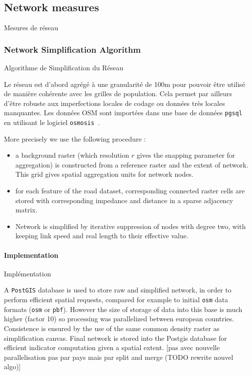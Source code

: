 \subsection{Network measures}{Mesures de réseau}




\subsubsection{Network Simplification Algorithm}{Algorithme de Simplification du Réseau}



Le réseau est d'abord agrégé à une granularité de 100m pour pouvoir être utilisé de manière cohérente avec les grilles de population. Cela permet par ailleurs d'être robuste aux imperfections locales de codage ou données très locales manquantes. Les données OSM sont importées dans une base de données \texttt{pgsql} en utilisant le logiciel \texttt{osmosis}~\cite{osmosis}.

 
 
More precisely we use the following procedure :
\begin{itemize}
\item a background raster (which resolution $r$ gives the snapping parameter for aggregation) is constructed from a reference raster and the extent of network. This grid gives spatial aggregation units for network nodes.
\item for each feature of the road dataset, corresponding connected raster cells are stored with corresponding impedance and distance in a sparse adjacency matrix.
\item Network is simplified by iterative suppression of nodes with degree two, with keeping link speed and real length to their effective value.
\end{itemize}




\paragraph{Implementation}{Implémentation}

A \texttt{PostGIS} database is used to store raw and simplified network, in order to perform efficient spatial requests, compared for example to initial \texttt{osm} data formats (\texttt{osm} or \texttt{pbf}). However the size of storage of data into this base is much higher (factor 10) so processing was parallelized between european countries. Consistence is ensured by the use of the same common density raster as simplification canvas. Final network is stored into the Postgis database for efficient indicator computation given a spatial extent. [pas avec nouvelle parallelisation pas par pays mais par split and merge (TODO rewrite nouvel algo)]



